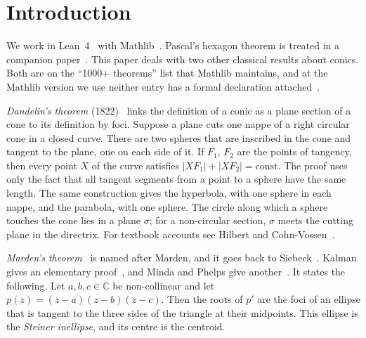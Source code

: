 \documentclass[11pt]{article}
\theoremstyle{remark}
\newcommand{\C}{\mathbb{C}}
\begin{document}
\section{Introduction}

We work in Lean~4~\cite{Lean4} with Mathlib~\cite{MathlibCPP}. Pascal's hexagon theorem is
treated in a companion paper~\cite{BaldPascal}. This paper deals with
two other classical results about conics. Both are on the ``1000+ theorems'' list that Mathlib
maintains, and at the Mathlib version we use neither entry has a formal declaration
attached~\cite{Mathlib1000}.

\emph{Dandelin's theorem} (1822)~\cite{Dandelin} links the definition of a conic as a plane section of a cone to its
definition by foci. Suppose a plane cuts one nappe of a right circular cone in a closed curve.
There are two spheres that are inscribed in the cone and tangent to the plane, one on each side of it. If $F_1$, $F_2$ are the points of tangency,
then every point $X$ of the curve satisfies $|XF_1|+|XF_2|=\text{const}$. The proof uses only the fact
that all tangent segments from a point to a sphere have the same length. The same construction
gives the hyperbola, with one sphere in each nappe, and the parabola, with one sphere. The circle along which a sphere touches the cone lies
in a plane $\sigma$; for a non-circular section, $\sigma$ meets the cutting plane in the directrix. For textbook accounts
see Hilbert and Cohn-Vossen~\cite{HilbertCV}.

\emph{Marden's theorem}~\cite{Marden1945,MardenBook} is named after Marden, and it goes back to
Siebeck~\cite{Siebeck}. Kalman gives an elementary proof~\cite{Kalman}, and Minda and Phelps
give another~\cite{MindaPhelps}. It states
the following. Let $a,b,c\in\C$ be non-collinear and let $p(z)=(z-a)(z-b)(z-c)$. Then the roots of
$p'$ are the foci of an ellipse that is tangent to the three sides of the triangle at their
midpoints. This ellipse is the \emph{Steiner inellipse}, and its centre is the centroid.
\end{document}
